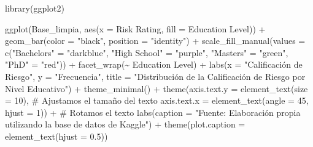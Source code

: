\documentclass[
  letterpaper,
  DIV=11,
  numbers=noendperiod]{scrreprt}
\newenvironment{Shaded}{\begin{snugshade}}{\end{snugshade}}
\newcommand{\AttributeTok}[1]{\textcolor[rgb]{0.40,0.45,0.13}{#1}}
\newcommand{\CommentTok}[1]{\textcolor[rgb]{0.37,0.37,0.37}{#1}}
\newcommand{\DecValTok}[1]{\textcolor[rgb]{0.68,0.00,0.00}{#1}}
\newcommand{\FloatTok}[1]{\textcolor[rgb]{0.68,0.00,0.00}{#1}}
\newcommand{\FunctionTok}[1]{\textcolor[rgb]{0.28,0.35,0.67}{#1}}
\newcommand{\NormalTok}[1]{\textcolor[rgb]{0.00,0.23,0.31}{#1}}
\newcommand{\OtherTok}[1]{\textcolor[rgb]{0.00,0.23,0.31}{#1}}
\newcommand{\SpecialCharTok}[1]{\textcolor[rgb]{0.37,0.37,0.37}{#1}}
\newcommand{\StringTok}[1]{\textcolor[rgb]{0.13,0.47,0.30}{#1}}
\begin{document}
\begin{Shaded}
\begin{Highlighting}[]
\FunctionTok{library}\NormalTok{(ggplot2)}

\FunctionTok{ggplot}\NormalTok{(Base\_limpia, }\FunctionTok{aes}\NormalTok{(}\AttributeTok{x =} \StringTok{\textasciigrave{}}\AttributeTok{Risk Rating}\StringTok{\textasciigrave{}}\NormalTok{, }\AttributeTok{fill =} \StringTok{\textasciigrave{}}\AttributeTok{Education Level}\StringTok{\textasciigrave{}}\NormalTok{)) }\SpecialCharTok{+}  
  \FunctionTok{geom\_bar}\NormalTok{(}\AttributeTok{color =} \StringTok{"black"}\NormalTok{, }\AttributeTok{position =} \StringTok{"identity"}\NormalTok{) }\SpecialCharTok{+}  
  \FunctionTok{scale\_fill\_manual}\NormalTok{(}\AttributeTok{values =} \FunctionTok{c}\NormalTok{(}\StringTok{"Bachelor\textquotesingle{}s"} \OtherTok{=} \StringTok{"darkblue"}\NormalTok{, }\StringTok{"High School"} \OtherTok{=} \StringTok{"purple"}\NormalTok{, }\StringTok{"Master\textquotesingle{}s"} \OtherTok{=} \StringTok{"green"}\NormalTok{, }\StringTok{"PhD"} \OtherTok{=} \StringTok{"red"}\NormalTok{)) }\SpecialCharTok{+}  
  \FunctionTok{facet\_wrap}\NormalTok{(}\SpecialCharTok{\textasciitilde{}} \StringTok{\textasciigrave{}}\AttributeTok{Education Level}\StringTok{\textasciigrave{}}\NormalTok{) }\SpecialCharTok{+}  
  \FunctionTok{labs}\NormalTok{(}\AttributeTok{x =} \StringTok{"Calificación de Riesgo"}\NormalTok{, }\AttributeTok{y =} \StringTok{"Frecuencia"}\NormalTok{, }\AttributeTok{title =} \StringTok{"Distribución de la Calificación de Riesgo por Nivel Educativo"}\NormalTok{) }\SpecialCharTok{+} 
  \FunctionTok{theme\_minimal}\NormalTok{() }\SpecialCharTok{+}
  \FunctionTok{theme}\NormalTok{(}\AttributeTok{axis.text.y =} \FunctionTok{element\_text}\NormalTok{(}\AttributeTok{size =} \DecValTok{10}\NormalTok{), }\CommentTok{\# Ajustamos el tamaño del texto}
        \AttributeTok{axis.text.x =} \FunctionTok{element\_text}\NormalTok{(}\AttributeTok{angle =} \DecValTok{45}\NormalTok{, }\AttributeTok{hjust =} \DecValTok{1}\NormalTok{)) }\SpecialCharTok{+} \CommentTok{\# Rotamos el texto}
  \FunctionTok{labs}\NormalTok{(}\AttributeTok{caption =} \StringTok{"Fuente: Elaboración propia utilizando la base de datos de Kaggle"}\NormalTok{) }\SpecialCharTok{+}
\FunctionTok{theme}\NormalTok{(}\AttributeTok{plot.caption =} \FunctionTok{element\_text}\NormalTok{(}\AttributeTok{hjust =} \FloatTok{0.5}\NormalTok{)) }
\end{Highlighting}
\end{Shaded}
\end{document}
